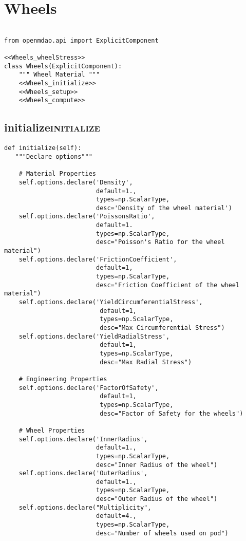 \documentclass[11pt]{article}
\begin{document}
\section{Wheels}
\label{sec:orga5fdb58}

\begin{verbatim}

from openmdao.api import ExplicitComponent

<<Wheels_wheelStress>>
class Wheels(ExplicitComponent):
    """ Wheel Material """
    <<Wheels_initialize>>
    <<Wheels_setup>>
    <<Wheels_compute>>
\end{verbatim}
\subsection{initialize\hfill{}\textsc{initialize}}
\label{sec:org381f1b0}
\begin{verbatim}
def initialize(self):
   """Declare options"""

    # Material Properties
    self.options.declare('Density', 
                         default=1.,
                         types=np.ScalarType,
                         desc='Density of the wheel material')
    self.options.declare('PoissonsRatio',
                         default=1.
                         types=np.ScalarType,
                         desc="Poisson's Ratio for the wheel material")
    self.options.declare('FrictionCoefficient',
                         default=1,
                         types=np.ScalarType,
                         desc="Friction Coefficient of the wheel material")
    self.options.declare('YieldCircumferentialStress',
                          default=1,
                          types=np.ScalarType,
                          desc="Max Circumferential Stress")
    self.options.declare('YieldRadialStress',
                          default=1,
                          types=np.ScalarType,
                          desc="Max Radial Stress")

    # Engineering Properties
    self.options.declare('FactorOfSafety',
                          default=1,
                          types=np.ScalarType,
                          desc="Factor of Safety for the wheels")

    # Wheel Properties
    self.options.declare('InnerRadius',
                         default=1.,
                         types=np.ScalarType,
                         desc="Inner Radius of the wheel")
    self.options.declare('OuterRadius',
                         default=1.,
                         types=np.ScalarType,
                         desc="Outer Radius of the wheel")
    self.options.declare("Multiplicity",
                         default=4.,
                         types=np.ScalarType,
                         desc="Number of wheels used on pod")
\end{verbatim}
\end{document}
